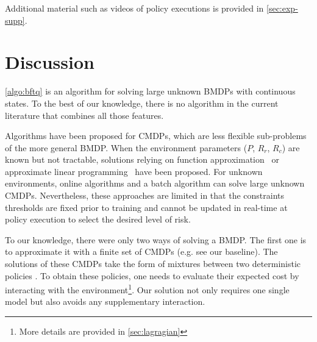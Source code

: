 Additional material such as videos of policy executions is provided in \autoref{sec:exp-supp}.

\section{Discussion}
\label{subsec:discussions}
\autoref{algo:bftq} is an algorithm for solving large unknown BMDPs with continuous states. To the best of our knowledge, there is no algorithm in the current literature that combines all those features.


Algorithms have been proposed for CMDPs, which are less flexible sub-problems of the more general BMDP. When the environment parameters ($P$, $R_r$, $R_c$) are known but not tractable, solutions relying on function approximation~\citep{Undurti} or approximate linear programming~\citep{Poupart2015} have been proposed. For unknown environments, online algorithms \citep{Geibel2005, Abe2010,ChowGJP15,AchiamHTA17} and a batch algorithm \citep{Thomas2015, Petrik2016, Laroche2019,le2019batch} can solve large unknown CMDPs. Nevertheless, these approaches are limited in that the constraints thresholds are fixed prior to training and cannot be updated in real-time at policy execution to select the desired level of risk.

To our knowledge, there were only two ways of solving a BMDP. The first one is to approximate it with a finite set of CMDPs (e.g. see our \FTQl baseline). The solutions of these CMDPs take the form of mixtures between two deterministic policies \citep[Theorem 4.4,][]{BEUTLER1985236}. To obtain these policies, one needs to evaluate their expected cost by interacting with the environment\footnote{More details are provided in \autoref{sec:lagragian}}. Our solution not only requires one single model but also avoids any supplementary interaction.

